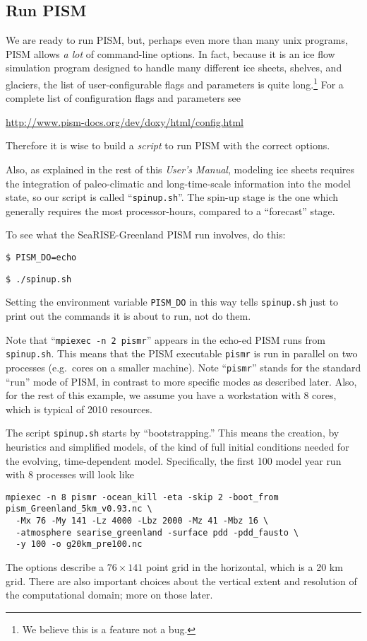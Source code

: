 \subsection{Run PISM}

We are ready to run PISM, but, perhaps even more than many unix programs, PISM allows \emph{a lot} of command-line options.  In fact, because it is an ice flow simulation program designed to handle many different ice sheets, shelves, and glaciers, the list of user-configurable flags and parameters is quite long.\footnote{We believe this is a feature not a bug.}  For a complete list of configuration flags and parameters see
\begin{center}
\url{http://www.pism-docs.org/dev/doxy/html/config.html}
\end{center}
Therefore it is wise to build a \emph{script} to run PISM with the correct options. 

Also, as explained in the rest of this \emph{User's Manual}, modeling ice sheets requires the integration of paleo-climatic and long-time-scale information into the model state, so our script is called ``\verb|spinup.sh|''.  The spin-up stage is the one which generally requires the most processor-hours, compared to a ``forecast'' stage.

To see what the SeaRISE-Greenland PISM run involves, do this:

\verb|$ PISM_DO=echo|

\verb|$ ./spinup.sh|

\noindent Setting the environment variable \verb|PISM_DO| in this way tells \verb|spinup.sh| just to print out the commands it is about to run, not do them.

Note that ``\verb|mpiexec -n 2 pismr|'' appears in the echo-ed PISM runs from \verb|spinup.sh|.  This means that the PISM executable \verb|pismr| is run in parallel on two processes (e.g.~cores on a smaller machine).  Note ``\verb|pismr|'' stands for the standard ``run'' mode of PISM, in contrast to more specific modes as described later.  Also, for the rest of this example, we assume you have a workstation with 8 cores, which is typical of 2010 resources.

The script \verb|spinup.sh| starts by ``bootstrapping.''  This means the creation, by heuristics and simplified models, of the kind of full initial conditions needed for the evolving, time-dependent model.  Specifically, the first 100 model year run with 8 processes will look like
\begin{verbatim}
mpiexec -n 8 pismr -ocean_kill -eta -skip 2 -boot_from pism_Greenland_5km_v0.93.nc \
  -Mx 76 -My 141 -Lz 4000 -Lbz 2000 -Mz 41 -Mbz 16 \
  -atmosphere searise_greenland -surface pdd -pdd_fausto \
  -y 100 -o g20km_pre100.nc
\end{verbatim}
The options describe a $76\times 141$ point grid in the horizontal, which is a 20 km grid.  There are also important choices about the vertical extent and resolution of the computational domain; more on those later.


